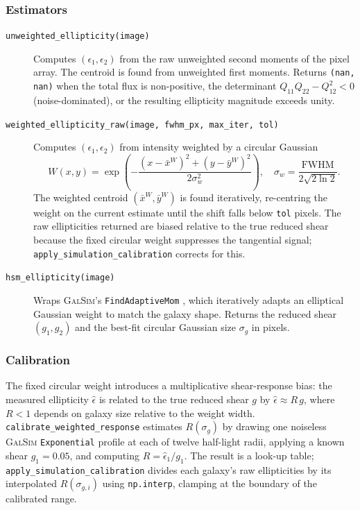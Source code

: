 \subsubsection*{Estimators}

\begin{description}
  \item[\texttt{unweighted\_ellipticity(image)}]
    Computes $(\epsilon_1, \epsilon_2)$ from the raw unweighted second moments
    of the pixel array. The centroid is found from unweighted first moments.
    Returns \texttt{(nan, nan)} when the total flux is non-positive, the
    determinant $Q_{11}Q_{22} - Q_{12}^2 < 0$ (noise-dominated), or the
    resulting ellipticity magnitude exceeds unity.

  \item[\texttt{weighted\_ellipticity\_raw(image, fwhm\_px, max\_iter, tol)}]
    Computes $(\epsilon_1, \epsilon_2)$ from intensity weighted by a circular
    Gaussian
    \begin{equation}
        W(x, y) = \exp\!\left(-\frac{(x-\bar{x}^W)^2 + (y-\bar{y}^W)^2}
                                     {2\sigma_w^2}\right), \quad
        \sigma_w = \frac{\mathrm{FWHM}}{2\sqrt{2\ln 2}}.
    \end{equation}
    The weighted centroid $(\bar{x}^W, \bar{y}^W)$ is found iteratively,
    re-centring the weight on the current estimate until the shift falls below
    \texttt{tol} pixels. The raw ellipticities returned are biased relative to
    the true reduced shear because the fixed circular weight suppresses the
    tangential signal; \texttt{apply\_simulation\_calibration} corrects for this.

  \item[\texttt{hsm\_ellipticity(image)}]
    Wraps \textsc{GalSim}'s \texttt{FindAdaptiveMom}
    \citep{Hirata2003, Mandelbaum2005}, which iteratively adapts an elliptical
    Gaussian weight to match the galaxy shape. Returns the reduced shear
    $(g_1, g_2)$ and the best-fit circular Gaussian size $\sigma_g$ in pixels.
\end{description}

\subsubsection*{Calibration}

The fixed circular weight introduces a multiplicative shear-response bias:
the measured ellipticity $\hat\epsilon$ is related to the true reduced shear
$g$ by $\hat\epsilon \approx R\,g$, where $R < 1$ depends on galaxy size
relative to the weight width. \texttt{calibrate\_weighted\_response} estimates
$R(\sigma_g)$ by drawing one noiseless \textsc{GalSim} \texttt{Exponential}
profile at each of twelve half-light radii, applying a known shear
$g_1 = 0.05$, and computing $R = \hat\epsilon_1 / g_1$. The result is a
look-up table; \texttt{apply\_simulation\_calibration} divides each galaxy's
raw ellipticities by its interpolated $R(\sigma_{g,i})$ using
\texttt{np.interp}, clamping at the boundary of the calibrated range.

